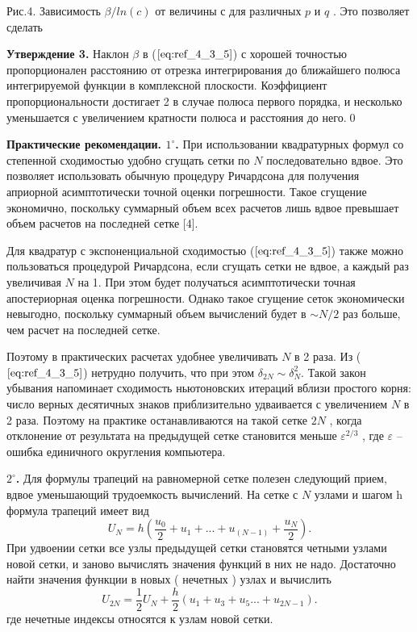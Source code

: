 Рис.4. Зависимость $\beta / ln(c)$ от величины с для различных $p$ и $q$ .
Это позволяет сделать

\textbf{Утверждение 3.} Наклон $\beta$ в ($\ref{eq:ref_4_3_5}$) с хорошей точностью пропорционален
расстоянию от отрезка интегрирования до ближайшего полюса интегрируемой
функции в комплексной плоскости. Коэффициент пропорциональности достигает 2 в случае полюса первого порядка, и несколько уменьшается с увеличением кратности полюса и расстояния до него.\qed

\textbf{Практические рекомендации. $1^{\circ}$.} При использовании квадратурных
формул со степенной сходимостью удобно сгущать сетки по $N$
последовательно вдвое. Это позволяет использовать обычную процедуру
Ричардсона для получения априорной асимптотически точной оценки
погрешности. Такое сгущение экономично, поскольку суммарный объем всех
расчетов лишь вдвое превышает объем расчетов на последней сетке [4].

Для квадратур с экспоненциальной сходимостью ($\ref{eq:ref_4_3_5}$) также можно
пользоваться процедурой Ричардсона, если сгущать сетки не вдвое, а каждый
раз увеличивая $N$ на 1. При этом будет получаться асимптотически точная
апостериорная оценка погрешности. Однако такое сгущение сеток
экономически невыгодно, поскольку суммарный объем вычислений будет в
$\sim N / 2$ раз больше, чем расчет на последней сетке.

Поэтому в практических расчетах удобнее увеличивать $N$ в 2 раза. Из ($\ref{eq:ref_4_3_5}$)
нетрудно получить, что при этом $\delta_{2N} \sim \delta_N^2$. Такой закон убывания напоминает
сходимость ньютоновских итераций вблизи простого корня: число верных
десятичных знаков приблизительно удваивается с увеличением $N$ в 2 раза.
Поэтому на практике останавливаются на такой сетке $2N$ , когда отклонение от
результата на предыдущей сетке становится меньше $\varepsilon^{2/3}$ , где $\varepsilon$ – ошибка
единичного округления компьютера.

\textbf{$2^{\circ}$.} Для формулы трапеций на равномерной сетке полезен следующий
прием, вдвое уменьшающий трудоемкость вычислений. На сетке с $N$ узлами и
шагом h формула трапеций имеет вид
\begin{equation}
U_N=h(\frac{u_0}{2}+u_1+...+u_(N-1)+\frac{u_N}{2}).
\label{eq:ref_4_3_8}
\end{equation}
При удвоении сетки все узлы предыдущей сетки становятся четными узлами
новой сетки, и заново вычислять значения функций в них не надо. Достаточно
найти значения функции в новых ( нечетных ) узлах и вычислить
\begin{equation}
U_{2N}=\frac{1}{2}U_N + \frac{h}{2}(u_1+u_3+u_5...+u_{2N-1}).
\label{eq:ref_4_3_9}
\end{equation}
где нечетные индексы относятся к узлам новой сетки.
\\

